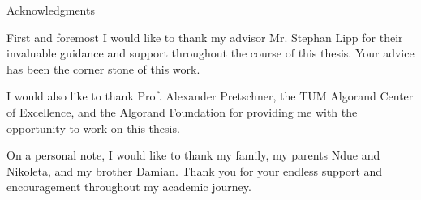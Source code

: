 \thispagestyle{empty}

\vspace*{20mm}

\begin{center}
    { Acknowledgments}
\end{center}

\vspace{10mm}

First and foremost I would like to thank my advisor Mr. Stephan Lipp for their invaluable guidance and support throughout the course of this thesis. Your advice has been the corner stone of this work.

I would also like to thank Prof. Alexander Pretschner, the TUM Algorand Center of Excellence, and the Algorand Foundation for providing me with the opportunity to work on this thesis.

On a personal note, I would like to thank my family, my parents Ndue and Nikoleta, and my brother Damian.
Thank you for your endless support and encouragement throughout my academic journey.

\cleardoublepage{}
